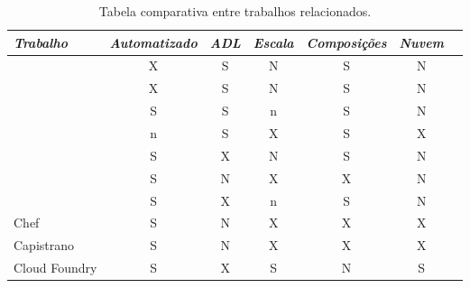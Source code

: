 \begin{table}[!t]
\begin{center}
    \begin{tabular}{l c c c c c c}
	 \hline
	 \itshape{Trabalho} & \itshape{Automatizado} & \itshape{ADL} & \itshape{Escala} & \itshape{Composições} & \itshape{Nuvem}  \\ \hline
    \cite{Magee1994Regis, Magee1996Dynamic} & X & S & N & S & N \\
    \cite{Balter1998Olan}   & X & S & N & S & N \\
    \cite{quema2004hierarchical}  & S & S & n & S & N \\
    \cite{akkerman2005j2ee}   & n & S & X & S & X \\
    \cite{Lacour2004Corba} & S & X & N & S & N \\
    \cite{Dolstra2005Configuration}   & S & N & X & X & N \\
    \cite{Watson2006Dynasoar}   & S & X & n & S & N \\
    Chef   & S & N & X & X & X \\
    Capistrano   & S & N & X & X & X \\
    Cloud Foundry   & S & X & S & N & S \\

    \end{tabular}
  \caption{Tabela comparativa entre trabalhos relacionados.}
  \label{tab:relacionados}
\end{center}
\end{table}




